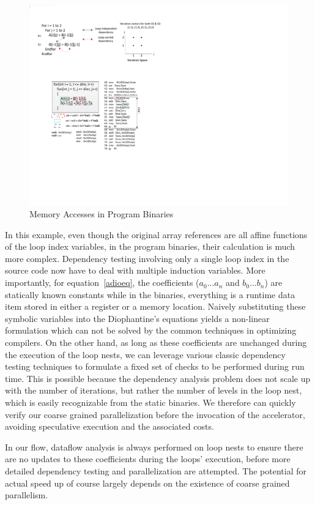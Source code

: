 \begin{figure}[htp]
\begin{center}
\includegraphics[width=0.8\linewidth]{chap6fig/memBin.pdf}
\caption{Memory Accesses in Program Binaries
\label{fig:mangledMem}}
\end{center}
\end{figure}

In this example, even though the original array references are all affine functions of the loop index variables, in the program binaries, their calculation is much more complex. 
Dependency testing involving only a single loop index in the source code now have to deal with multiple induction variables. More importantly, for equation~\ref{adioeq}, the coefficients ($a_0...a_n$ and $b_0 ... b_n$) are statically known constants while
in the binaries, everything is a runtime data item stored in either a register or a memory location. Naively 
substituting these symbolic variables into the Diophantine's equations yields
a non-linear formulation which can not be solved by the common techniques
in optimizing compilers. On the other hand, %
as long as these coefficients are unchanged during the execution of the loop nests, we can leverage various classic dependency testing techniques to formulate a fixed set of checks to be performed during run time. This is possible because the dependency
analysis problem does not scale up with the number of iterations, but rather the number of levels in the loop nest, which is easily recognizable from the static binaries. We therefore can quickly verify our coarse grained parallelization before the invocation of the accelerator, 
avoiding speculative execution and the associated costs. 

In our flow, dataflow analysis is always performed on loop nests to ensure there are no updates to these coefficients during the loops' execution, before more detailed dependency testing and parallelization are attempted. The  potential for actual speed up of course largely depends on the existence of coarse grained parallelism.



